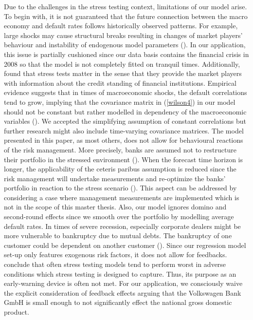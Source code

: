 \documentclass[a4paper, 11pt]{scrreprt}
\begin{document}
Due to the challenges in the stress testing context, limitations of our model arise.
To begin with, it is not guaranteed that the future connection between the macro economy and default rates follows historically observed patterns. For example, large shocks may cause structural breaks resulting in changes of market players' behaviour and instability of endogenous model parameters (\textcite[p. 21]{bis2004sorge}). In our application, this issue is partially cushioned since our data basis contains the financial crisis in 2008 so that the model is not completely fitted on tranquil times. Additionally, \textcite{gross2017dostresstestsmatter} found that stress tests matter in the sense that they provide the market players with information about the credit standing of financial institutions.
Empirical evidence suggests that in times of macroeconomic shocks, the default correlations tend to grow, implying that the covariance matrix in (\ref{wilson4}) in our model should not be constant but rather modelled in dependency of the macroeconomic variables (\textcite[p. 25]{bis2004sorge}). We accepted the simplifying assumption of constant correlations but further research might also include time-varying covariance matrices.
The model presented in this paper, as most others, does not allow for behavioural reactions of the risk management. More precisely, banks are assumed not to restructure their portfolio in the stressed environment (\textcite[p. 5]{borio2014stress}).
When the forecast time horizon is longer, the applicability of the ceteris paribus assumption is reduced since the risk management will undertake measurements and re-optimize the banks' portfolio in reaction to the stress scenario (\textcite[p. 16]{bis2004sorge}).
This aspect can be addressed by considering a case where management measurements are implemented which is not in the scope of this master thesis.
Also, our model ignores domino and second-round effects since we smooth over the portfolio by modelling average default rates. In times of severe recession, especially corporate dealers might be more vulnerable to bankruptcy due to mutual debts. The bankruptcy of one customer could be dependent on another customer (\textcite[p. 7]{bis2004sorge}).
Since our regression model set-up only features exogenous risk factors, it does not allow for feedbacks.
\textcite[p. 7]{borio2014stress} conclude that often stress testing models tend to perform worst in adverse conditions which stress testing is designed to capture. Thus, its purpose as an early-warning device is often not met. For our application, we consciously waive the explicit consideration of feedback effects arguing that the Volkswagen Bank GmbH is small enough to not significantly effect the national gross domestic product.
\end{document}
